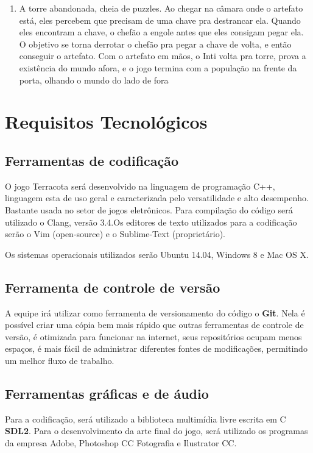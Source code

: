 \documentclass[12pt]{article}
\begin{document}
\begin{enumerate}
\item A torre abandonada, cheia de puzzles. Ao chegar na câmara onde o artefato
está, eles percebem que precisam de uma chave pra destrancar ela. Quando eles
encontram a chave, o chefão a engole antes que eles consigam pegar ela. O objetivo
se torna derrotar o chefão pra pegar a chave de volta, e então conseguir o artefato.
Com o artefato em mãos, o Inti volta pra torre, prova a existência do mundo afora,
e o jogo termina com a população na frente da porta, olhando o mundo do lado de fora
\end{enumerate}

\section{Requisitos Tecnológicos}

\subsection{Ferramentas de codificação}
O jogo Terracota será desenvolvido na linguagem de programação C++, linguagem
esta de uso geral e caracterizada pelo versatilidade e alto desempenho. Bastante
usada no setor de jogos eletrônicos. Para compilação do código será utilizado o
Clang, versão 3.4.Os editores de texto utilizados para a codificação serão o Vim
(open-source) e o Sublime-Text (proprietário).

Os sistemas operacionais utilizados serão Ubuntu 14.04, Windows 8 e Mac OS X.

\subsection{Ferramenta de controle de versão}
A equipe irá utilizar como ferramenta de versionamento do código o {\bf Git}.
Nela é possível criar uma cópia bem mais rápido que outras ferramentas de
controle de versão, é otimizada para funcionar na internet, seus repositórios
ocupam menos espaços, é mais fácil de administrar diferentes fontes de
modificações, permitindo um melhor fluxo de trabalho.

\subsection{Ferramentas gráficas e de áudio}
Para a codificação, será utilizado a biblioteca multimídia livre escrita em C
{\bf SDL2}. Para o desenvolvimento da arte final do jogo, será utilizado os
programas da empresa Adobe, Photoshop CC Fotografia e Ilustrator CC.
\end{document}
